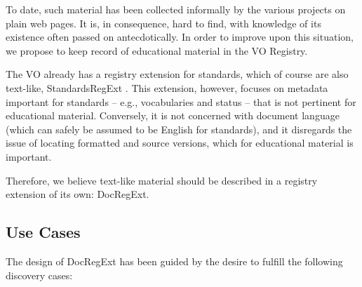 \documentclass{ivoa}
\begin{document}
To date, such material has been collected informally by the various
projects on plain web pages.  It is, in consequence, hard to find, with
knowledge of its existence often passed on antecdotically. In order to improve upon 
this situation, we
propose to keep record of educational material in the VO Registry.

The VO already has a registry extension for standards, which of
course are also text-like, StandardsRegExt \citep{2012ivoa.spec.0508H}.  This extension,
however, focuses on metadata important for standards – e.g.,
vocabularies and status – that is not pertinent for educational
material.  Conversely, it is not concerned with document language (which
can safely be assumed to be English for standards), and it disregards
the issue of locating formatted and source versions, which for educational
material is important.  

Therefore, we believe text-like material should be described in a 
registry extension of its own: DocRegExt.


\subsection{Use Cases}

\label{sect:regext-usecases}

The design of DocRegExt has been guided by the desire to fulfill the
following discovery cases:
\end{document}
